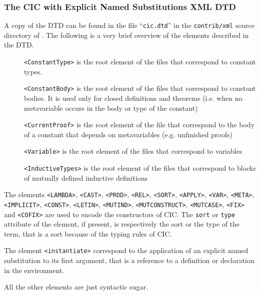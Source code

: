 \subsubsection{The CIC with Explicit Named Substitutions XML DTD}
 
A copy of the DTD can be found in the file ``\verb+cic.dtd+'' in the
\verb+contrib/xml+ source directory of \Coq.
The following is a very brief overview of the elements described in the DTD.
 
\begin{description}
 \item[]\texttt{<ConstantType>}
   is the root element of the files that correspond to constant types.
 \item[]\texttt{<ConstantBody>}
   is the root element of the files that correspond to constant bodies.
   It is used only for closed definitions and theorems (i.e. when no
   metavariable occurs in the body or type of the constant)
 \item[]\texttt{<CurrentProof>}
   is the root element of the file that correspond to the body of a constant
   that depends on metavariables (e.g. unfinished proofs)
 \item[]\texttt{<Variable>}
   is the root element of the files that correspond to variables
 \item[]\texttt{<InductiveTypes>}
   is the root element of the files that correspond to blocks
   of mutually defined inductive definitions
\end{description}
 
The elements
 \verb+<LAMBDA>+, \verb+<CAST>+, \verb+<PROD>+, \verb+<REL>+, \verb+<SORT>+,
 \verb+<APPLY>+, \verb+<VAR>+, \verb+<META>+, \verb+<IMPLICIT>+, \verb+<CONST>+, \verb+<LETIN>+, \verb+<MUTIND>+, \verb+<MUTCONSTRUCT>+, \verb+<MUTCASE>+,
 \verb+<FIX>+ and \verb+<COFIX>+ are used to encode the constructors of CIC.
 The \verb+sort+ or \verb+type+ attribute of the element, if present, is
 respectively the sort or the type of the term, that is a sort because of the
 typing rules of CIC.
 
The element \verb+<instantiate>+ correspond to the application of an explicit
named substitution to its first argument, that is a reference to a definition
or declaration in the environment.
 
All the other elements are just syntactic sugar.


